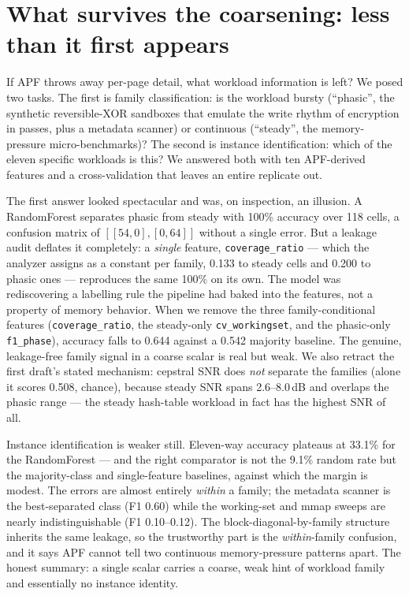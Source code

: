 \documentclass[11pt]{article}
\begin{document}
\section{What survives the coarsening: less than it first appears}

If APF throws away per-page detail, what workload information is left? We posed
two tasks. The first is family classification: is the workload bursty
(``phasic'', the synthetic reversible-XOR sandboxes that emulate the write
rhythm of encryption in passes, plus a metadata scanner) or continuous
(``steady'', the memory-pressure micro-benchmarks)? The second is instance
identification: which of the eleven specific workloads is this? We answered both
with ten APF-derived features and a cross-validation that leaves an entire
replicate out.

The first answer looked spectacular and was, on inspection, an illusion. A
RandomForest separates phasic from steady with 100\% accuracy over 118 cells, a
confusion matrix of $[[54,0],[0,64]]$ without a single error. But a leakage audit
deflates it completely: a \emph{single} feature, \texttt{coverage\_ratio} ---
which the analyzer assigns as a constant per family, 0.133 to steady cells and
0.200 to phasic ones --- reproduces the same 100\% on its own. The model was
rediscovering a labelling rule the pipeline had baked into the features, not a
property of memory behavior. When we remove the three family-conditional
features (\texttt{coverage\_ratio}, the steady-only \texttt{cv\_workingset}, and
the phasic-only \texttt{f1\_phase}), accuracy falls to 0.644 against a 0.542
majority baseline. The genuine, leakage-free family signal in a coarse scalar is
real but weak. We also retract the first draft's stated mechanism: cepstral SNR
does \emph{not} separate the families (alone it scores 0.508, chance), because
steady SNR spans 2.6--8.0\,dB and overlaps the phasic range --- the steady
hash-table workload in fact has the highest SNR of all.

Instance identification is weaker still. Eleven-way accuracy plateaus at 33.1\%
for the RandomForest --- and the right comparator is not the 9.1\% random rate
but the majority-class and single-feature baselines, against which the margin is
modest. The errors are almost entirely \emph{within} a family; the metadata
scanner is the best-separated class (F1 0.60) while the working-set and mmap
sweeps are nearly indistinguishable (F1 0.10--0.12). The block-diagonal-by-family
structure inherits the same leakage, so the trustworthy part is the
\emph{within}-family confusion, and it says APF cannot tell two continuous
memory-pressure patterns apart. The honest summary: a single scalar carries a
coarse, weak hint of workload family and essentially no instance identity.
\end{document}
